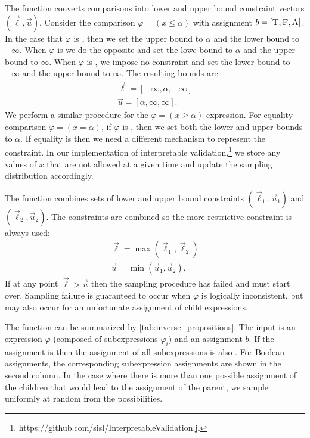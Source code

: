 The function  converts comparisons into lower and upper bound constraint vectors $(\vec{\ell}, \vec{u})$. Consider the comparison $\varphi = (x \leq \alpha)$ with assignment $b = [\textsc{T}, \textsc{F}, \textsc{A}]$. In the case that $\varphi$ is \True{}, then we set the upper bound to $\alpha$ and the lower bound to $-\infty$. When $\varphi$ is \False{} we do the opposite and set the lowe bound to $\alpha$ and the upper bound to $\infty$. When $\varphi$ is \Arbitrary{}, we impose no constraint and set the lower bound to $-\infty$ and the upper bound to $\infty$. The resulting bounds are
\begin{align}
    \vec{\ell} = [-\infty, \alpha, -\infty] \\
    \vec{u} = [\alpha, \infty, \infty] \text{.}
\end{align}
We perform a similar procedure for the $\varphi = (x \geq \alpha)$ expression. For equality comparison $\varphi = (x = \alpha)$, if $\varphi$ is \True{}, then we set both the lower and upper bounds to $\alpha$. If equality is \False{} then we need a different mechanism to represent the constraint. In our implementation of interpretable validation,\footnote{https://github.com/sisl/InterpretableValidation.jl} we store any values of $x$ that are not allowed at a given time and update the sampling distribution accordingly. 

The function  combines sets of lower and upper bound constraints $(\vec{\ell}_1, \vec{u}_1)$ and $(\vec{\ell}_2, \vec{u}_2)$. The constraints are combined so the more restrictive constraint is always used:
\begin{align}
\vec{\ell} = \max(\vec{\ell}_1, \vec{\ell}_2) \\
\vec{u} = \min(\vec{u}_1, \vec{u}_2) \text{.}
\end{align}
If at any point $\vec{\ell} > \vec{u}$ then the sampling procedure has failed and must start over. Sampling failure is guaranteed to occur when $\varphi$ is logically inconsistent, but may also occur for an unfortunate assignment of child expressions. 

The function  can be summarized by \cref{tab:inverse_propositions}. The input is an expression $\varphi$ (composed of subexpressions $\varphi_i$) and an assignment $b$. If the assignment is \Arbitrary{} then the assignment of all subexpressions is also \Arbitrary{}. For Boolean assignments, the corresponding subexpression assignments are shown in the second column. In the case where there is more than one possible assignment of the children that would lead to the assignment of the parent, we sample uniformly at random from the possibilities. 


